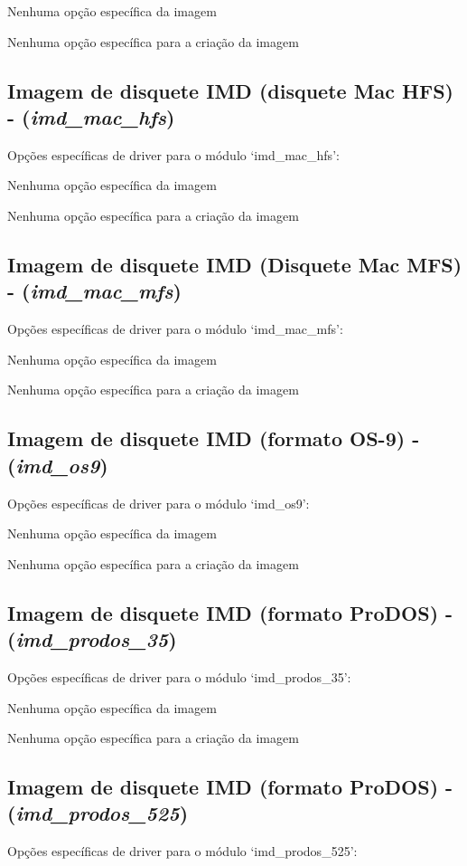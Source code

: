 \documentclass[letterpaper,10pt,brazil]{sphinxmanual}
\begin{document}
Nenhuma opção específica da imagem

Nenhuma opção específica para a criação da imagem


\subsection{Imagem de disquete IMD (disquete Mac HFS) - (\emph{imd\_mac\_hfs})}
\label{tools/imgtool:imagem-de-disquete-imd-disquete-mac-hfs-imd-mac-hfs}
Opções específicas de driver para o módulo `imd\_mac\_hfs':

Nenhuma opção específica da imagem

Nenhuma opção específica para a criação da imagem


\subsection{Imagem de disquete IMD (Disquete Mac MFS) - (\emph{imd\_mac\_mfs})}
\label{tools/imgtool:imagem-de-disquete-imd-disquete-mac-mfs-imd-mac-mfs}
Opções específicas de driver para o módulo `imd\_mac\_mfs':

Nenhuma opção específica da imagem

Nenhuma opção específica para a criação da imagem


\subsection{Imagem de disquete IMD (formato OS-9) - (\emph{imd\_os9})}
\label{tools/imgtool:imagem-de-disquete-imd-formato-os-9-imd-os9}
Opções específicas de driver para o módulo `imd\_os9':

Nenhuma opção específica da imagem

Nenhuma opção específica para a criação da imagem


\subsection{Imagem de disquete IMD (formato ProDOS) - (\emph{imd\_prodos\_35})}
\label{tools/imgtool:imagem-de-disquete-imd-formato-prodos-imd-prodos-35}
Opções específicas de driver para o módulo `imd\_prodos\_35':

Nenhuma opção específica da imagem

Nenhuma opção específica para a criação da imagem


\subsection{Imagem de disquete IMD (formato ProDOS) - (\emph{imd\_prodos\_525})}
\label{tools/imgtool:imagem-de-disquete-imd-formato-prodos-imd-prodos-525}
Opções específicas de driver para o módulo `imd\_prodos\_525':
\end{document}
